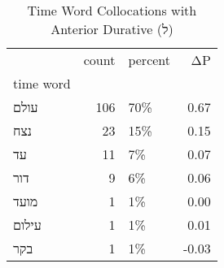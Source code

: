 \begin{table}[htbp!]
\centering
\caption{Time Word Collocations with Anterior Durative (ל)}
\label{table:antdurל_head_cpd}
\begin{tabular}{lrlr}
\toprule
{} &  count & percent &    ΔP \\
time word &        &         &       \\
\midrule
עולם      &    106 &     70\% &  0.67 \\
נצח       &     23 &     15\% &  0.15 \\
עד        &     11 &      7\% &  0.07 \\
דור       &      9 &      6\% &  0.06 \\
מועד      &      1 &      1\% &  0.00 \\
עילום     &      1 &      1\% &  0.01 \\
בקר       &      1 &      1\% & -0.03 \\
\bottomrule
\end{tabular}
\end{table}
